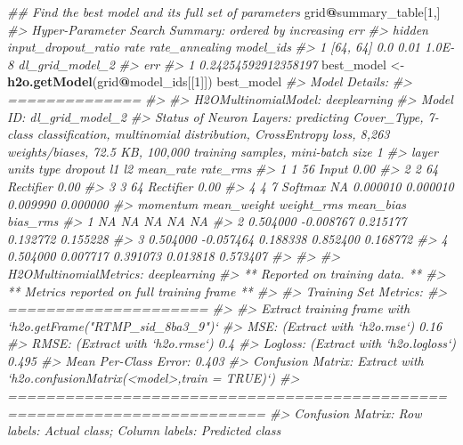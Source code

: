 \documentclass[]{book}
\newenvironment{Shaded}{\begin{snugshade}}{\end{snugshade}}
\newcommand{\CommentTok}[1]{\textcolor[rgb]{0.56,0.35,0.01}{\textit{#1}}}
\newcommand{\DecValTok}[1]{\textcolor[rgb]{0.00,0.00,0.81}{#1}}
\newcommand{\KeywordTok}[1]{\textcolor[rgb]{0.13,0.29,0.53}{\textbf{#1}}}
\newcommand{\NormalTok}[1]{#1}
\newcommand{\OperatorTok}[1]{\textcolor[rgb]{0.81,0.36,0.00}{\textbf{#1}}}
\newcommand{\StringTok}[1]{\textcolor[rgb]{0.31,0.60,0.02}{#1}}
\begin{document}
\begin{Shaded}
\begin{Highlighting}[]
\CommentTok{## Find the best model and its full set of parameters}
\NormalTok{grid}\OperatorTok{@}\NormalTok{summary_table[}\DecValTok{1}\NormalTok{,]}
\CommentTok{#> Hyper-Parameter Search Summary: ordered by increasing err}
\CommentTok{#>     hidden input_dropout_ratio rate rate_annealing       model_ids}
\CommentTok{#> 1 [64, 64]                 0.0 0.01         1.0E-8 dl_grid_model_2}
\CommentTok{#>                   err}
\CommentTok{#> 1 0.24254592912358197}
\NormalTok{best_model <-}\StringTok{ }\KeywordTok{h2o.getModel}\NormalTok{(grid}\OperatorTok{@}\NormalTok{model_ids[[}\DecValTok{1}\NormalTok{]])}
\NormalTok{best_model}
\CommentTok{#> Model Details:}
\CommentTok{#> ==============}
\CommentTok{#> }
\CommentTok{#> H2OMultinomialModel: deeplearning}
\CommentTok{#> Model ID:  dl_grid_model_2 }
\CommentTok{#> Status of Neuron Layers: predicting Cover_Type, 7-class classification, multinomial distribution, CrossEntropy loss, 8,263 weights/biases, 72.5 KB, 100,000 training samples, mini-batch size 1}
\CommentTok{#>   layer units      type dropout       l1       l2 mean_rate rate_rms}
\CommentTok{#> 1     1    56     Input  0.00 %       NA       NA        NA       NA}
\CommentTok{#> 2     2    64 Rectifier  0.00 % 0.000010 0.000010  0.009990 0.000000}
\CommentTok{#> 3     3    64 Rectifier  0.00 % 0.000010 0.000010  0.009990 0.000000}
\CommentTok{#> 4     4     7   Softmax      NA 0.000010 0.000010  0.009990 0.000000}
\CommentTok{#>   momentum mean_weight weight_rms mean_bias bias_rms}
\CommentTok{#> 1       NA          NA         NA        NA       NA}
\CommentTok{#> 2 0.504000   -0.008767   0.215177  0.132772 0.155228}
\CommentTok{#> 3 0.504000   -0.057464   0.188338  0.852400 0.168772}
\CommentTok{#> 4 0.504000    0.007717   0.391073  0.013818 0.573407}
\CommentTok{#> }
\CommentTok{#> }
\CommentTok{#> H2OMultinomialMetrics: deeplearning}
\CommentTok{#> ** Reported on training data. **}
\CommentTok{#> ** Metrics reported on full training frame **}
\CommentTok{#> }
\CommentTok{#> Training Set Metrics: }
\CommentTok{#> =====================}
\CommentTok{#> }
\CommentTok{#> Extract training frame with `h2o.getFrame("RTMP_sid_8ba3_9")`}
\CommentTok{#> MSE: (Extract with `h2o.mse`) 0.16}
\CommentTok{#> RMSE: (Extract with `h2o.rmse`) 0.4}
\CommentTok{#> Logloss: (Extract with `h2o.logloss`) 0.495}
\CommentTok{#> Mean Per-Class Error: 0.403}
\CommentTok{#> Confusion Matrix: Extract with `h2o.confusionMatrix(<model>,train = TRUE)`)}
\CommentTok{#> =========================================================================}
\CommentTok{#> Confusion Matrix: Row labels: Actual class; Column labels: Predicted class}
}}}
\end{Highlighting}
\end{Shaded}
\end{document}
